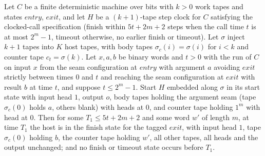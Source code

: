 \begin{theorem}
\label{Turing.NTimeDiag.qy_clockHost_finish}
\leanok
{}
Let $C$ be a finite deterministic machine over bits with $k > 0$ work tapes and states
$\mathit{entry}$, $\mathit{exit}$, and let $H$ be a $(k+1)$-tape step clock for $C$ satisfying the
clocked-call specification (finish within $5t + 2m + 2$ steps when the call time $t$ is at most
$2^m - 1$, timeout otherwise, no earlier finish or timeout). Let $\sigma$ inject $k + 1$ tapes
into $K$ host tapes, with body tapes $\sigma_c(i) = \sigma(i)$ for $i < k$ and counter tape
$c_t = \sigma(k)$. Let $x, a, b$ be binary words and $t > 0$ with the run of $C$ on input $x$ from
the seam configuration at $\mathit{entry}$ with argument $a$ avoiding $\mathit{exit}$ strictly
between times $0$ and $t$ and reaching the seam configuration at $\mathit{exit}$ with result $b$
at time $t$, and suppose $t \le 2^m - 1$. Start $H$ embedded along $\sigma$ in its start state
with input head $1$, output $o$, body tapes holding the argument seam (tape $\sigma_c(0)$ holds
$a$, others blank) with heads at $0$, and counter tape holding $1^m$ with head at $0$. Then for
some $T_1 \le 5t + 2m + 2$ and some word $w'$ of length $m$, at time $T_1$ the host is in the
finish state for the tagged $\mathit{exit}$, with input head $1$, tape $\sigma_c(0)$ holding $b$,
the counter tape holding $w'$, all other tapes, all heads and the output unchanged; and no finish
or timeout state occurs before $T_1$.
\end{theorem}

